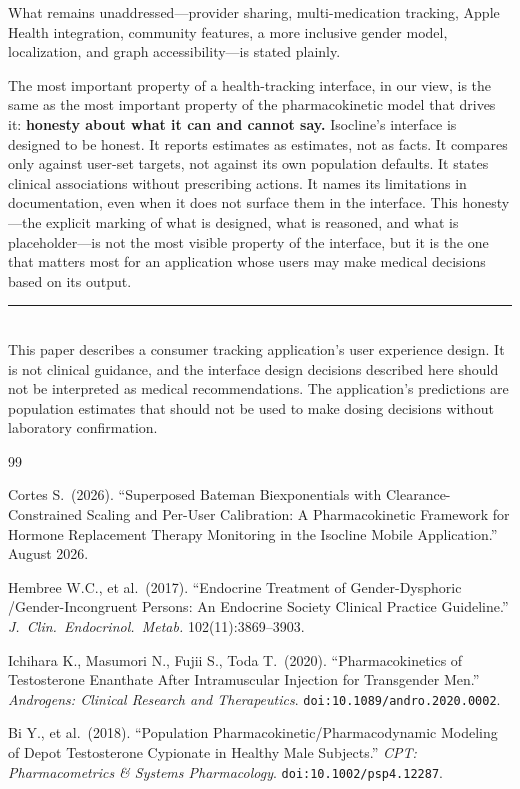 \documentclass[11pt,a4paper]{article}
\begin{document}
What remains unaddressed---provider sharing, multi-medication tracking,
Apple Health integration, community features, a more inclusive gender
model, localization, and graph accessibility---is stated plainly.

The most important property of a health-tracking interface, in our view,
is the same as the most important property of the pharmacokinetic model
that drives it: \textbf{honesty about what it can and cannot say.} Isocline's
interface is designed to be honest. It reports estimates as estimates,
not as facts. It compares only against user-set targets, not against its
own population defaults. It states clinical associations without
prescribing actions. It names its limitations in documentation, even when
it does not surface them in the interface. This honesty---the explicit
marking of what is designed, what is reasoned, and what is
placeholder---is not the most visible property of the interface, but it
is the one that matters most for an application whose users may make
medical decisions based on its output.

\vfill
\noindent\rule{\linewidth}{0.4pt}\\[0.3em]
{\footnotesize This paper describes a consumer tracking application's
user experience design. It is not clinical guidance, and the interface
design decisions described here should not be interpreted as medical
recommendations. The application's predictions are population estimates
that should not be used to make dosing decisions without laboratory
confirmation.}

\begin{thebibliography}{99}

Cortes S.\ (2026). ``Superposed Bateman Biexponentials with
Clearance-Constrained Scaling and Per-User Calibration: A Pharmacokinetic
Framework for Hormone Replacement Therapy Monitoring in the Isocline Mobile
Application.'' August 2026.

Hembree W.C., et al.\ (2017). ``Endocrine Treatment of Gender-Dysphoric
/Gender-Incongruent Persons: An Endocrine Society Clinical Practice
Guideline.'' \emph{J.\ Clin.\ Endocrinol.\ Metab.} 102(11):3869--3903.

Ichihara K., Masumori N., Fujii S., Toda T.\ (2020). ``Pharmacokinetics
of Testosterone Enanthate After Intramuscular Injection for Transgender
Men.'' \emph{Androgens: Clinical Research and Therapeutics}.
\texttt{doi:10.1089/andro.2020.0002}.

Bi Y., et al.\ (2018). ``Population Pharmacokinetic/Pharmacodynamic
Modeling of Depot Testosterone Cypionate in Healthy Male Subjects.''
\emph{CPT: Pharmacometrics \& Systems Pharmacology}.
\texttt{doi:10.1002/psp4.12287}.

\end{thebibliography}
\end{document}
